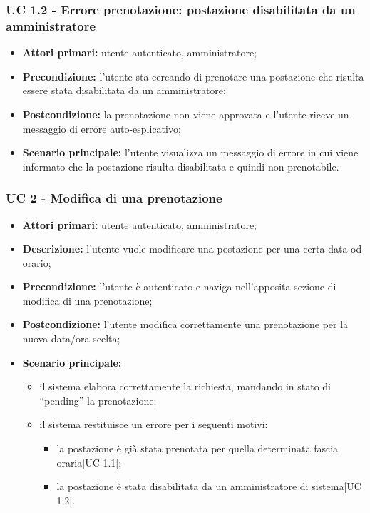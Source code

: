 \subsubsection{UC 1.2 - Errore prenotazione: postazione disabilitata da un amministratore}
\begin{itemize}
\item \textbf{Attori primari:} utente autenticato, amministratore;
\item \textbf{Precondizione:} l'utente sta cercando di prenotare una postazione che risulta essere stata disabilitata da un amministratore;
\item \textbf{Postcondizione:} la prenotazione non viene approvata e l'utente riceve un messaggio di errore auto-esplicativo;
\item \textbf{Scenario principale:} l'utente visualizza un messaggio di errore in cui viene informato che la postazione risulta disabilitata e quindi non prenotabile.
\end{itemize}


\subsubsection{UC 2 - Modifica di una prenotazione}

\begin{itemize}
\item \textbf{Attori primari:} utente autenticato, amministratore;
\item \textbf{Descrizione:} l’utente vuole modificare una postazione per una certa data od orario;
\item \textbf{Precondizione:} l’utente è autenticato e naviga nell’apposita sezione di modifica di una prenotazione;
\item \textbf{Postcondizione:} l’utente modifica correttamente una prenotazione per la nuova data/ora scelta;
\item \textbf{Scenario principale:} 
	\begin{itemize}
		\item il sistema elabora correttamente la richiesta, mandando in stato di “pending” la prenotazione;
		\item il sistema restituisce un errore per i seguenti motivi:
		\begin{itemize}
			\item la postazione è già stata prenotata per quella determinata fascia oraria[UC 1.1];
			\item la postazione è stata disabilitata da un amministratore di sistema[UC 1.2].	
		\end{itemize}
	\end{itemize}
\end{itemize}

